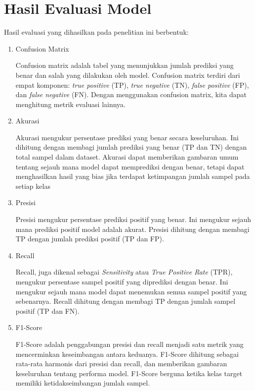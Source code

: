 \section{Hasil Evaluasi Model}
Hasil evaluasi yang dihasilkan pada penelitian ini berbentuk:
\begin{enumerate}[nolistsep]
  \item Confusion Matrix

        Confusion matrix adalah tabel yang menunjukkan jumlah prediksi yang benar dan salah yang dilakukan oleh
        model. Confusion matrix terdiri dari empat komponen: \emph{true positive} (TP), \emph{true negative} (TN), \emph{false
          positive} (FP), dan \emph{false negative} (FN). Dengan menggunakan confusion matrix, kita dapat menghitung
        metrik evaluasi lainnya.

  \item Akurasi

        Akurasi mengukur persentase prediksi yang benar secara keseluruhan. Ini dihitung dengan membagi jumlah
        prediksi yang benar (TP dan TN) dengan total sampel dalam dataset. Akurasi dapat memberikan gambaran
        umum tentang sejauh mana model dapat memprediksi dengan benar, tetapi dapat menghasilkan hasil yang
        bias jika terdapat ketimpangan jumlah sampel pada setiap kelas

  \item Presisi

        Presisi mengukur persentase prediksi positif yang benar. Ini mengukur sejauh mana prediksi positif
        model adalah akurat. Presisi dihitung dengan membagi TP dengan jumlah prediksi positif (TP dan FP).

  \item Recall

        Recall, juga dikenal sebagai \emph{Sensitivity} atau \emph{True Positive Rate} (TPR), mengukur persentase sampel
        positif yang diprediksi dengan benar. Ini mengukur sejauh mana model dapat menemukan semua sampel
        positif yang sebenarnya. Recall dihitung dengan membagi TP dengan jumlah sampel positif (TP dan FN).

  \item F1-Score

        F1-Score adalah penggabungan presisi dan recall menjadi satu metrik yang mencerminkan keseimbangan
        antara keduanya. F1-Score dihitung sebagai rata-rata harmonis dari presisi dan recall, dan memberikan
        gambaran keseluruhan tentang performa model. F1-Score berguna ketika kelas target memiliki
        ketidakseimbangan jumlah sampel.

\end{enumerate}

